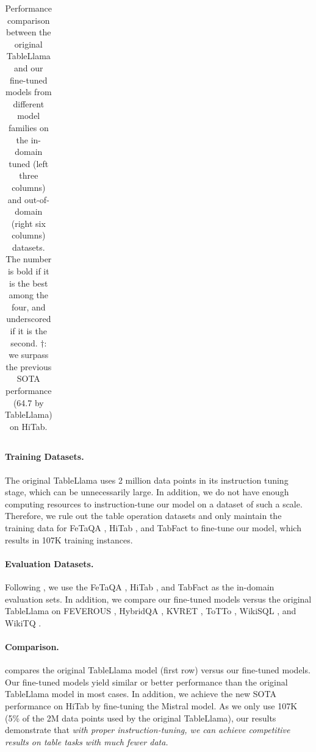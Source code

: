 \documentclass[11pt]{article}
\begin{document}
\begin{table}[t]
{\begin{tabular}{c|ccc|ccccccc}
    \bottomrule
    \end{tabular}
    }
    
    \caption{Performance comparison between the original TableLlama and our fine-tuned models from different model families on the in-domain tuned (left three columns) and out-of-domain (right six columns) datasets.
    The number is bold if it is the best among the four, and underscored if it is the second.
    $\dagger$: we surpass the previous SOTA performance (64.7 by TableLlama) on HiTab.
    }
    \label{tab:mistral-tablellama}
\end{table}

\paragraph{Training Datasets.} 
The original TableLlama \citep{zhang-etal-2024-tablellama} uses 2 million data points in its instruction tuning stage, which can be unnecessarily large.
In addition, we do not have enough computing resources to instruction-tune our model on a dataset of such a scale.
Therefore, we rule out the table operation datasets and only maintain the training data for FeTaQA \citep{nan-etal-2022-fetaqa}, HiTab \citep{cheng-etal-2022-hitab}, and TabFact \citep{Chen2020TabFact} to fine-tune our model, which results in 107K training instances.

\paragraph{Evaluation Datasets.}
Following \citet{zhang-etal-2024-tablellama}, we use the FeTaQA \citep{nan-etal-2022-fetaqa}, HiTab \citep{cheng-etal-2022-hitab}, and TabFact \citep{Chen2020TabFact} as the in-domain evaluation sets.
In addition, we compare our fine-tuned models versus the original TableLlama on FEVEROUS \citep{aly-etal-2021-fact}, HybridQA \citep{chen-etal-2020-hybridqa}, KVRET \citep{eric2017key}, ToTTo \citep{parikh-etal-2020-totto}, WikiSQL \citep{zhong2018seqsql}, and WikiTQ \citep{pasupat-liang-2015-compositional}.

\paragraph{Comparison.}
 compares the original TableLlama model (first row) versus our fine-tuned models.
Our fine-tuned models yield similar or better performance than the original TableLlama model in most cases.
In addition, we achieve the new SOTA performance on HiTab by fine-tuning the Mistral model.
As we only use 107K (5\% of the 2M data points used by the original TableLlama), our results demonstrate that \textit{with proper instruction-tuning, we can achieve competitive results on table tasks with much fewer data.}
\end{document}
